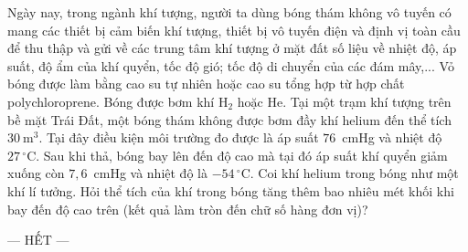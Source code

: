 	\begin{ex}%
		Ngày nay, trong ngành khí tượng, người ta dùng bóng thám không vô tuyến có mang các thiết bị cảm biến khí tượng, thiết bị vô tuyến điện và định vị toàn cầu để thu thập và gửi về các trung tâm khí tượng ở mặt đất số liệu về nhiệt độ, áp suất, độ ẩm của khí quyển, tốc độ gió; tốc độ di chuyển của các đám mây,... Vỏ bóng được làm bằng cao su tự nhiên hoặc cao su tổng hợp từ hợp chất polychloroprene. Bóng được bơm khí $\text{H}_2$ hoặc He. Tại một trạm khí tượng trên bề mặt Trái Đất, một bóng thám không được bơm đầy khí helium đến thể tích $30~\text{m}^3$. Tại đây điều kiện môi trường đo được là áp suất $76$~cmHg và nhiệt độ $27\,^\circ\text{C}$. Sau khi thả, bóng bay lên đến độ cao mà tại đó áp suất khí quyển giảm xuống còn $7{,}6$~cmHg và nhiệt độ là $-54\,^\circ\text{C}$. Coi khí helium trong bóng như một khí lí tưởng. Hỏi thể tích của khí trong bóng tăng thêm bao nhiêu mét khối khi bay đến độ cao trên (kết quả làm tròn đến chữ số hàng đơn vị)?
		\par
	\end{ex}

	\centerline{--- HẾT ---}


